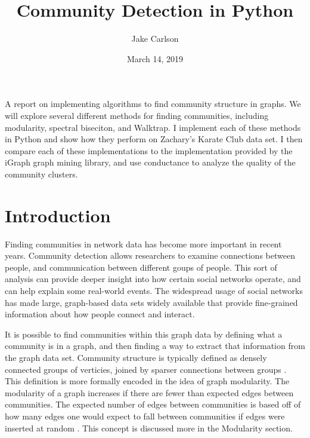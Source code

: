 \documentclass{article}
\begin{document}
\title{Community Detection in Python}
\author{Jake Carlson}
\date{March 14, 2019}
\maketitle

\abstract
A report on implementing algorithms to find community structure in graphs. We will explore several different methods for finding communities, including modularity, spectral biseciton, and Walktrap. I implement each of these methods in Python and show how they perform on Zachary's Karate Club data set. I then compare each of these implementations to the implementation provided by the iGraph graph mining library, and use conductance to analyze the quality of the community clusters.
\newpage

\tableofcontents
\newpage

\section{Introduction}
Finding communities in network data has become more important in recent years. Community detection allows researchers to examine connections between people, and communication between different goups of people. This sort of analysis can provide deeper insight into how certain social networks operate, and can help explain some real-world events. The widespread usage of social networks has made large, graph-based data sets widely available that provide fine-grained information about how people connect and interact.
\par
It is possible to find communities within this graph data by defining what a community is in a graph, and then finding a way to extract that information from the graph data set. Community structure is typically defined as densely connected groups of verticies, joined by sparser connections between groups \cite{Newman2004}. This definition is more formally encoded in the idea of graph modularity. The modularity of a graph increases if there are fewer than expected edges between communities. The expected number of edges between communities is based off of how many edges one would expect to fall between communities if edges were inserted at random \cite{Newman2006}. This concept is discussed more in the Modularity section.

\end{document}
